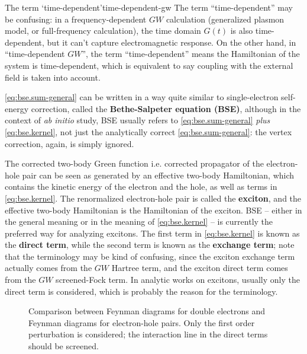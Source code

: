 \documentclass[hyperref, a4paper, 12pt]{report}
\newcommand*{\concept}[1]{{\textbf{#1}}}
\newcommand*{\abinitio}{\textit{ab initio}}
\begin{document}
\begin{infobox}{The term `time-dependent'}{time-dependent-gw}
    The term ``time-dependent'' may be confusing:
    in a frequency-dependent $GW$ calculation 
    (generalized plasmon model, or full-frequency calculation),
    the time domain $G(t)$ is also time-dependent,
    but it can't capture electromagnetic response.
    On the other hand, in ``time-dependent $GW$'',
    the term ``time-dependent''
    means the Hamiltonian of the system is time-dependent,
    which is equivalent to say coupling with the external field 
    is taken into account. 
\end{infobox}

\eqref{eq:bse.sum-general} can be written in a way 
quite similar to single-electron self-energy correction,
called the \concept{Bethe-Salpeter equation (BSE)},
although in the context of \abinitio{} study, 
BSE usually refers to \eqref{eq:bse.sum-general} \emph{plus} \eqref{eq:bse.kernel}, 
not just the analytically correct \eqref{eq:bse.sum-general}:
the vertex correction, again, is simply ignored.

The corrected two-body Green function i.e. corrected propagator of the electron-hole pair 
can be seen as generated by 
an effective two-body Hamiltonian,
which contains the kinetic energy of the electron and the hole,
as well as terms in \eqref{eq:bse.kernel}.
The renormalized electron-hole pair 
is called the \concept{exciton},
and the effective two-body Hamiltonian is the Hamiltonian of the exciton. 
BSE -- either in the general meaning or in the meaning of \eqref{eq:bse.kernel} -- 
is currently the preferred way for analyzing excitons.
The first term in \eqref{eq:bse.kernel} is known as the \concept{direct term}, 
while the second term is known as the \concept{exchange term}; 
note that the terminology may be kind of confusing, 
since the exciton exchange term actually comes from the $GW$ Hartree term, 
and the exciton direct term comes from the $GW$ screened-Fock term.
In analytic works on excitons, 
usually only the direct term is considered, 
which is probably the reason for the terminology.

\begin{figure}
    \centering
    
    \caption{Comparison between Feynman diagrams for double electrons 
    and Feynman diagrams for electron-hole pairs.
    Only the first order perturbation is considered; 
    the interaction line in the direct terms should be screened.}
    \label{fig:electron-electron-electron-hole}
\end{figure}
\end{document}
